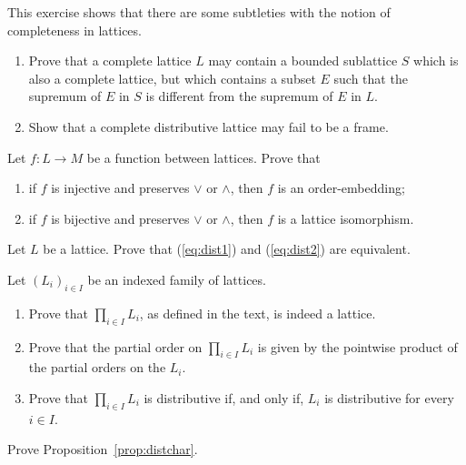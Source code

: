 \begin{exercise}\label{exe:counterexamples-complete}
This exercise shows that there are some subtleties with the notion of completeness in lattices.
\begin{enumerate}

\item Prove that a complete lattice $L$ may contain a bounded sublattice $S$ which is also a complete lattice, but which contains a subset $E$ such that the supremum of $E$ in $S$ is different from the supremum of $E$ in $L$.

\item \label{ite:compDLnotframe} Show that a complete distributive lattice may fail to be a frame.
  
   
\end{enumerate}
\end{exercise}
\begin{exercise}\label{exe:injlatthom}
Let $f \colon L \to M$ be a function between lattices. Prove that
\begin{enumerate}
\item if $f$ is injective and preserves $\vee$ or $\wedge$, then $f$ is an order-embedding;
\item if $f$ is bijective and preserves $\vee$ or $\wedge$, then $f$ is a lattice isomorphism.
\end{enumerate}
\end{exercise}
\begin{exercise}\label{exe:disteq}
Let $L$ be a lattice. Prove that (\ref{eq:dist1}) and (\ref{eq:dist2}) are equivalent. 
\end{exercise}
\begin{exercise}\label{exe:product-lattices}
Let $(L_i)_{i \in I}$ be an indexed family of lattices.
\begin{enumerate}
  \item Prove that $\prod_{i \in I} L_i$, as defined in the text, is indeed a lattice.
  \item Prove that the partial order on $\prod_{i \in I}L_i$ is given by the pointwise product of the partial orders on the $L_i$.
  \item Prove that $\prod_{i\in I}L_i$ is distributive if, and only if, $L_i$ is distributive for every $i \in I$.
\end{enumerate}
\end{exercise}
\begin{exercise}\label{exe:distchar}
Prove Proposition~\ref{prop:distchar}.
\end{exercise}

